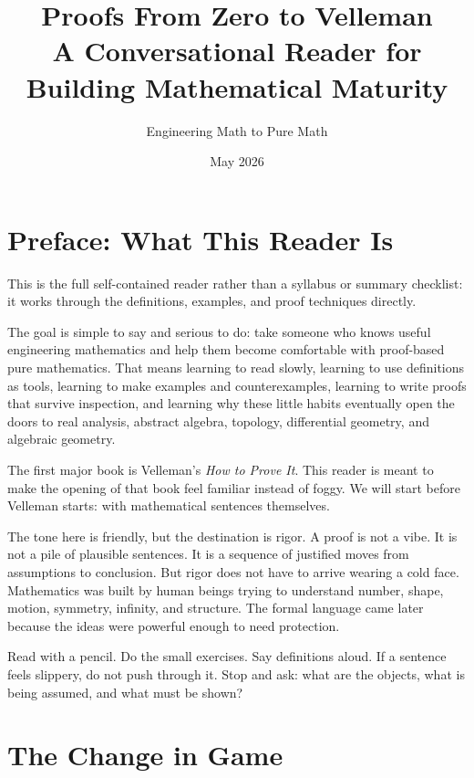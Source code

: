 \documentclass[11pt]{article}
\title{\textbf{Proofs From Zero to Velleman}\\A Conversational Reader for Building Mathematical Maturity}
\author{Engineering Math to Pure Math}
\date{May 2026}
\begin{document}
\maketitle
\tableofcontents
\newpage

\section*{Preface: What This Reader Is}

This is the full self-contained reader rather than a syllabus or summary checklist: it works through the definitions, examples, and proof techniques directly.

The goal is simple to say and serious to do: take someone who knows useful engineering mathematics and help them become comfortable with proof-based pure mathematics. That means learning to read slowly, learning to use definitions as tools, learning to make examples and counterexamples, learning to write proofs that survive inspection, and learning why these little habits eventually open the doors to real analysis, abstract algebra, topology, differential geometry, and algebraic geometry.

The first major book is Velleman's \emph{How to Prove It}. This reader is meant to make the opening of that book feel familiar instead of foggy. We will start before Velleman starts: with mathematical sentences themselves.

The tone here is friendly, but the destination is rigor. A proof is not a vibe. It is not a pile of plausible sentences. It is a sequence of justified moves from assumptions to conclusion. But rigor does not have to arrive wearing a cold face. Mathematics was built by human beings trying to understand number, shape, motion, symmetry, infinity, and structure. The formal language came later because the ideas were powerful enough to need protection.

\begin{focusbox}
Read with a pencil. Do the small exercises. Say definitions aloud. If a sentence feels slippery, do not push through it. Stop and ask: what are the objects, what is being assumed, and what must be shown?
\end{focusbox}

\newpage
\section{The Change in Game}
\end{document}
